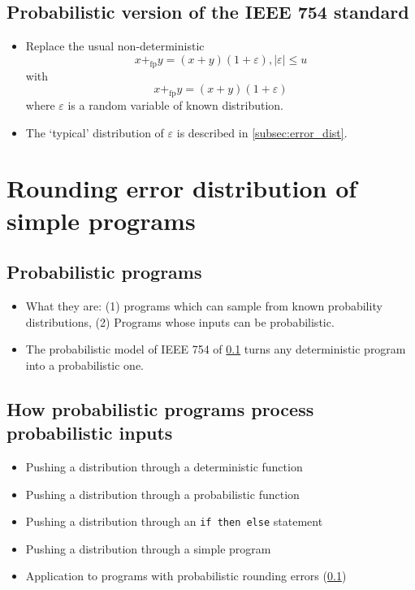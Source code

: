\documentclass[10pt,conference]{IEEEtran}
\newcommand{\pfp}{+_{\mathrm{fp}}}
\newcommand{\absv}[1]{\vert #1\vert}
\begin{document}
\subsection{Probabilistic version of the IEEE 754 standard}\label{subsec:prob_ieee754}

\begin{itemize}
\item Replace the usual non-deterministic 
\[
x\pfp y=(x+y)(1+\varepsilon), \absv{\varepsilon}\leq u
\]
with
\[
x\pfp y=(x+y)(1+\varepsilon)
\]
where $\varepsilon$ is a random variable of known distribution.
\item The `typical' distribution of $\varepsilon$ is described in \cref{subsec:error_dist}.
\end{itemize}

\section{Rounding error distribution of simple programs}

\subsection{Probabilistic programs}
\begin{itemize}
\item What they are: (1) programs which can sample from known probability distributions, (2) Programs whose inputs can be probabilistic.
\item The probabilistic model of IEEE 754 of \cref{subsec:prob_ieee754} turns any deterministic program into a probabilistic one.
\end{itemize}

\subsection{How probabilistic programs process probabilistic inputs}
\begin{itemize}
\item Pushing a distribution through a deterministic function
\item Pushing a distribution through a probabilistic function
\item Pushing a distribution through an \texttt{if then else} statement
\item Pushing a distribution through a simple program
\item Application to programs with probabilistic rounding errors (\cref{subsec:prob_ieee754})
\end{itemize}
\end{document}
